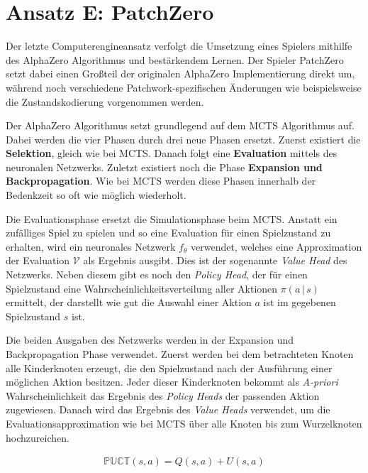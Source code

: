 \pagebreak

\section{Ansatz E: PatchZero}
\label{section:erstellung-ansatz-d}

Der letzte Computerengineansatz verfolgt die Umsetzung eines Spielers mithilfe des AlphaZero Algorithmus und bestärkendem Lernen. Der Spieler PatchZero setzt dabei einen Großteil der originalen AlphaZero Implementierung direkt um, während noch verschiedene Patchwork-spezifischen Änderungen wie beispielsweise die Zustandskodierung vorgenommen werden.

Der AlphaZero Algorithmus setzt grundlegend auf dem \ac{MCTS} Algorithmus auf. Dabei werden die vier Phasen durch drei neue Phasen ersetzt. Zuerst existiert die \textbf{Selektion}, gleich wie bei \ac{MCTS}. Danach folgt eine \textbf{Evaluation} mittels des neuronalen Netzwerks. Zuletzt existiert noch die Phase \textbf{Expansion und Backpropagation}. Wie bei \ac{MCTS} werden diese Phasen innerhalb der Bedenkzeit so oft wie möglich wiederholt.

Die Evaluationsphase ersetzt die Simulationsphase beim \ac{MCTS}. Anstatt ein zufälliges Spiel zu spielen und so eine Evaluation für einen Spielzustand zu erhalten, wird ein neuronales Netzwerk $f_\theta$ verwendet, welches eine Approximation der Evaluation $\mathcal{V}$ als Ergebnis ausgibt. Dies ist der sogenannte \emph{Value Head} des Netzwerks. Neben diesem gibt es noch den \emph{Policy Head}, der für einen Spielzustand eine Wahrscheinlichkeitsverteilung aller Aktionen $\pi\left(a\,|\,s\right)$ ermittelt, der darstellt wie gut die Auswahl einer Aktion $a$ ist im gegebenen Spielzustand $s$ ist.

Die beiden Ausgaben des Netzwerks werden in der Expansion und Backpropagation Phase verwendet. Zuerst werden bei dem betrachteten Knoten alle Kinderknoten erzeugt, die den Spielzustand nach der Ausführung einer möglichen Aktion besitzen. Jeder dieser Kinderknoten bekommt als \emph{A-priori} Wahrscheinlichkeit das Ergebnis des \emph{Policy Heads} der passenden Aktion zugewiesen. Danach wird das Ergebnis des \emph{Value Heads} verwendet, um die Evaluationsapproximation wie bei \ac{MCTS} über alle Knoten bis zum Wurzelknoten hochzureichen.

\begin{align}
    \label{eqn:alpha-zero-puct}
    \mathbb{PUCT}\left(s, a\right) = Q\left(s,a\right) + U\left(s,a\right)
\end{align}

